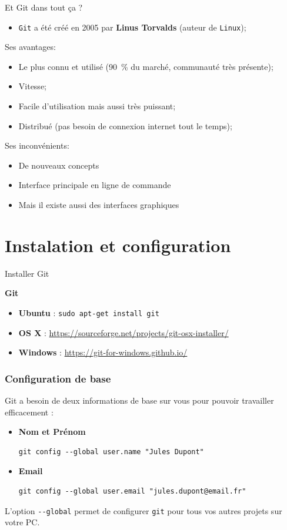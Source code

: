 \documentclass{beamer}
\begin{document}
\begin{frame}{Et Git dans tout ça ?}
\begin{itemize}
    \item \texttt{Git} a été créé en 2005 par \textbf{Linus Torvalds} (auteur de \texttt{Linux});
\end{itemize}
Ses avantages:
\begin{itemize}
    \item Le plus connu et utilisé (90~\% du marché, communauté très présente);
    \item Vitesse;
    \item Facile d'utilisation mais aussi très puissant;
    \item Distribué (pas besoin de connexion internet tout le temps);
\end{itemize}

Ses inconvénients:
\begin{itemize}
    \item De nouveaux concepts
    \item Interface principale en ligne de commande
    \item Mais il existe aussi des interfaces graphiques
\end{itemize}
\end{frame}

\section{Instalation et configuration}
\begin{frame}{Installer Git}

\textbf{Git}
\begin{itemize}
    \item[] \textbf{Ubuntu} : \lstinline{sudo apt-get install git}
    \item[] \textbf{OS X} : \url{https://sourceforge.net/projects/git-osx-installer/}
    \item[] \textbf{Windows} : \url{https://git-for-windows.github.io/}
\end{itemize}
\end{frame}

\begin{frame}[fragile]
\frametitle{Configuration de base}

Git a besoin de deux informations de base sur vous pour pouvoir travailler efficacement :

\begin{itemize}
\item \textbf{Nom et Prénom}
\begin{lstlisting}
git config --global user.name "Jules Dupont"
\end{lstlisting}

\item \textbf{Email}
\begin{lstlisting}
git config --global user.email "jules.dupont@email.fr"
\end{lstlisting}
\end{itemize}

L'option \lstinline{--global} permet de configurer \texttt{git} pour tous vos autres projets sur votre PC.
\end{frame}
\end{document}
